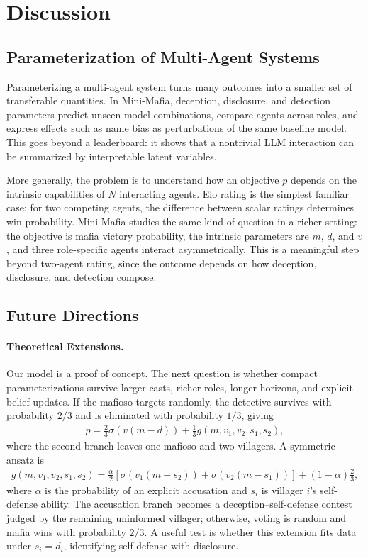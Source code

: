 \documentclass{article}
\begin{document}
\section{Discussion}
\label{sec:discussion}

\subsection{Parameterization of Multi-Agent Systems}

Parameterizing a multi-agent system turns many outcomes into a smaller set of transferable quantities. In Mini-Mafia, deception, disclosure, and detection parameters predict unseen model combinations, compare agents across roles, and express effects such as name bias as perturbations of the same baseline model. This goes beyond a leaderboard: it shows that a nontrivial LLM interaction can be summarized by interpretable latent variables.

More generally, the problem is to understand how an objective $p$ depends on the intrinsic capabilities of $N$ interacting agents. Elo rating is the simplest familiar case: for two competing agents, the difference between scalar ratings determines win probability. Mini-Mafia studies the same kind of question in a richer setting: the objective is mafia victory probability, the intrinsic parameters are $m$, $d$, and $v$, and three role-specific agents interact asymmetrically. This is a meaningful step beyond two-agent rating, since the outcome depends on how deception, disclosure, and detection compose.

\subsection{Future Directions}

\paragraph{Theoretical Extensions.} Our model is a proof of concept. The next question is whether compact parameterizations survive larger casts, richer roles, longer horizons, and explicit belief updates. If the mafioso targets randomly, the detective survives with probability $2/3$ and is eliminated with probability $1/3$, giving
\begin{align}
    p = \frac{2}{3}\sigma\!\left(v(m-d)\right) + \frac{1}{3}g(m,v_1,v_2,s_1,s_2),
\end{align}
where the second branch leaves one mafioso and two villagers. A symmetric ansatz is
\begin{align}
    g(m,v_1,v_2,s_1,s_2) = \frac{\alpha}{2}\!\left[\sigma\!\left(v_1(m-s_2)\right)+\sigma\!\left(v_2(m-s_1)\right)\right]+(1-\alpha)\frac{2}{3},
\end{align}
where $\alpha$ is the probability of an explicit accusation and $s_i$ is villager $i$'s self-defense ability. The accusation branch becomes a deception--self-defense contest judged by the remaining uninformed villager; otherwise, voting is random and mafia wins with probability $2/3$. A useful test is whether this extension fits data under $s_i=d_i$, identifying self-defense with disclosure.
\end{document}
